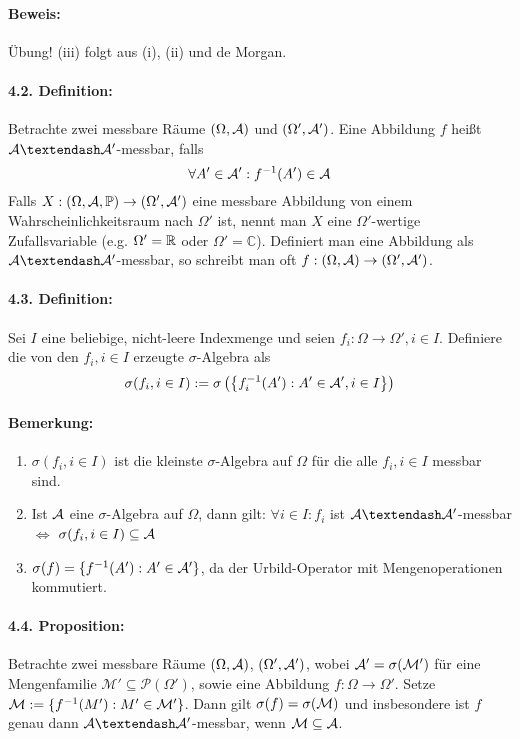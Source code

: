\documentclass[12pt]{report}
\begin{document}
\paragraph{Beweis:} \"Ubung! (iii) folgt aus (i), (ii) und de Morgan.

\paragraph{4.2. Definition:}Betrachte zwei messbare R\"aume $(\Omega,\mathcal{A})$ und $(\Omega',\mathcal{A}')$. Eine Abbildung $f$ hei\ss{}t $\A\textendash\A'$-messbar, falls 
$$\forall A'\in\mathcal{A}':f^{-1}(A')\in\mathcal{A}$$
Falls $X:(\Omega, \mathcal{A}, \mathbb{P})\to(\Omega',\mathcal{A}')$ eine messbare Abbildung von einem Wahrscheinlichkeitsraum nach $\Omega'$ ist, nennt man $X$ eine $\Omega'$-wertige Zufallsvariable (e.g. $\Omega'=\mathbb{R}$ oder $\Omega'=\mathbb{C}$). Definiert man eine Abbildung als $\A\textendash\A'$-messbar, so schreibt man oft $f:(\Omega,\mathcal{A})\to(\Omega',\mathcal{A}')$.

\paragraph{4.3. Definition:}Sei $I$ eine beliebige, nicht-leere Indexmenge und seien $f_i:\Omega\to\Omega',i\in I$. Definiere die von den $f_i,i\in I$ erzeugte $\sigma$-Algebra als
$$\sigma(f_i,i\in I):=\sigma\left(\left\{f_i^{-1}(A'):A'\in\mathcal{A}',i\in I\right\}\right)$$
 
 \paragraph{Bemerkung:}
 \begin{enumerate}[label=(\roman*)]
     \item $\sigma(f_i,i\in I)$ ist die kleinste $\sigma$-Algebra auf $\Omega$ f\"ur die alle $f_i,i\in I$ messbar sind.
     \item Ist $\mathcal{A}$ eine $\sigma$-Algebra auf $\Omega$, dann gilt: $\forall i\in I:f_i$ ist $\A\textendash\A'$-messbar $\iff$ $\sigma(f_i,i\in I)\subseteq\mathcal{A}$
     \item $\sigma(f)=\{f^{-1}(A'):A'\in\mathcal{A}'\}$, da der Urbild-Operator mit Mengenoperationen kommutiert. 
 \end{enumerate}
 
 \paragraph{4.4. Proposition:}Betrachte zwei messbare R\"aume $(\Omega,\mathcal{A})$, $(\Omega',\mathcal{A}')$, wobei $\mathcal{A}'=\sigma(\mathcal{M'})$ f\"ur eine Mengenfamilie $\mathcal{M'}\subseteq\mathcal{P}(\Omega')$, sowie eine Abbildung $f:\Omega\to\Omega'$. Setze $\mathcal{M}:=\{f^{-1}(M'):M'\in\mathcal{M}'\}$. Dann gilt $\sigma(f)=\sigma(\mathcal{M})$ und insbesondere ist $f$ genau dann $\A\textendash\A'$-messbar, wenn $\mathcal{M}\subseteq\mathcal{A}$.
 
\end{document}
